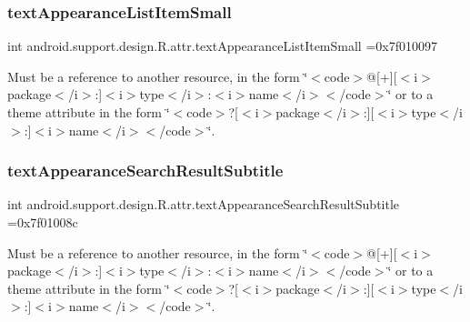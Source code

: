 \subsubsection{\texorpdfstring{text\+Appearance\+List\+Item\+Small}{textAppearanceListItemSmall}}
{\footnotesize\ttfamily int android.\+support.\+design.\+R.\+attr.\+text\+Appearance\+List\+Item\+Small =0x7f010097\hspace{0.3cm}{\ttfamily [static]}}

Must be a reference to another resource, in the form \char`\"{}$<$code$>$@\mbox{[}+\mbox{]}\mbox{[}$<$i$>$package$<$/i$>$\+:\mbox{]}$<$i$>$type$<$/i$>$\+:$<$i$>$name$<$/i$>$$<$/code$>$\char`\"{} or to a theme attribute in the form \char`\"{}$<$code$>$?\mbox{[}$<$i$>$package$<$/i$>$\+:\mbox{]}\mbox{[}$<$i$>$type$<$/i$>$\+:\mbox{]}$<$i$>$name$<$/i$>$$<$/code$>$\char`\"{}. \mbox{\label{classandroid_1_1support_1_1design_1_1R_1_1attr_ad4c3cf0a421f6da8cf158eb72380097d}} 
\subsubsection{\texorpdfstring{text\+Appearance\+Search\+Result\+Subtitle}{textAppearanceSearchResultSubtitle}}
{\footnotesize\ttfamily int android.\+support.\+design.\+R.\+attr.\+text\+Appearance\+Search\+Result\+Subtitle =0x7f01008c\hspace{0.3cm}{\ttfamily [static]}}

Must be a reference to another resource, in the form \char`\"{}$<$code$>$@\mbox{[}+\mbox{]}\mbox{[}$<$i$>$package$<$/i$>$\+:\mbox{]}$<$i$>$type$<$/i$>$\+:$<$i$>$name$<$/i$>$$<$/code$>$\char`\"{} or to a theme attribute in the form \char`\"{}$<$code$>$?\mbox{[}$<$i$>$package$<$/i$>$\+:\mbox{]}\mbox{[}$<$i$>$type$<$/i$>$\+:\mbox{]}$<$i$>$name$<$/i$>$$<$/code$>$\char`\"{}. \mbox{\label{classandroid_1_1support_1_1design_1_1R_1_1attr_a15f9a24fe28950f36a19a12cef2cae15}} 
